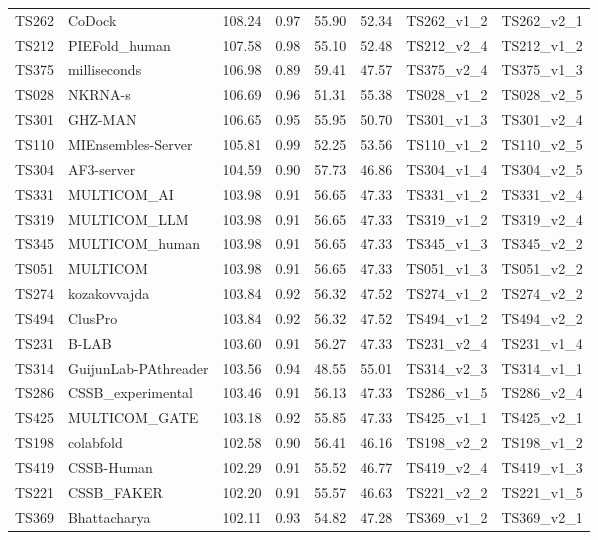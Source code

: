\begin{longtable}{llllllll}
TS262 & CoDock & 108.24 & 0.97 & 55.90 & 52.34 & TS262\_v1\_2 & TS262\_v2\_1 \\ 
TS212 & PIEFold\_human & 107.58 & 0.98 & 55.10 & 52.48 & TS212\_v2\_4 & TS212\_v1\_2 \\ 
TS375 & milliseconds & 106.98 & 0.89 & 59.41 & 47.57 & TS375\_v2\_4 & TS375\_v1\_3 \\ 
TS028 & NKRNA-s & 106.69 & 0.96 & 51.31 & 55.38 & TS028\_v1\_2 & TS028\_v2\_5 \\ 
TS301 & GHZ-MAN & 106.65 & 0.95 & 55.95 & 50.70 & TS301\_v1\_3 & TS301\_v2\_4 \\ 
TS110 & MIEnsembles-Server & 105.81 & 0.99 & 52.25 & 53.56 & TS110\_v1\_2 & TS110\_v2\_5 \\ 
TS304 & AF3-server & 104.59 & 0.90 & 57.73 & 46.86 & TS304\_v1\_4 & TS304\_v2\_5 \\ 
TS331 & MULTICOM\_AI & 103.98 & 0.91 & 56.65 & 47.33 & TS331\_v1\_2 & TS331\_v2\_4 \\ 
TS319 & MULTICOM\_LLM & 103.98 & 0.91 & 56.65 & 47.33 & TS319\_v1\_2 & TS319\_v2\_4 \\ 
TS345 & MULTICOM\_human & 103.98 & 0.91 & 56.65 & 47.33 & TS345\_v1\_3 & TS345\_v2\_2 \\ 
TS051 & MULTICOM & 103.98 & 0.91 & 56.65 & 47.33 & TS051\_v1\_3 & TS051\_v2\_2 \\ 
TS274 & kozakovvajda & 103.84 & 0.92 & 56.32 & 47.52 & TS274\_v1\_2 & TS274\_v2\_2 \\ 
TS494 & ClusPro & 103.84 & 0.92 & 56.32 & 47.52 & TS494\_v1\_2 & TS494\_v2\_2 \\ 
TS231 & B-LAB & 103.60 & 0.91 & 56.27 & 47.33 & TS231\_v2\_4 & TS231\_v1\_4 \\ 
TS314 & GuijunLab-PAthreader & 103.56 & 0.94 & 48.55 & 55.01 & TS314\_v2\_3 & TS314\_v1\_1 \\ 
TS286 & CSSB\_experimental & 103.46 & 0.91 & 56.13 & 47.33 & TS286\_v1\_5 & TS286\_v2\_4 \\ 
TS425 & MULTICOM\_GATE & 103.18 & 0.92 & 55.85 & 47.33 & TS425\_v1\_1 & TS425\_v2\_1 \\ 
TS198 & colabfold & 102.58 & 0.90 & 56.41 & 46.16 & TS198\_v2\_2 & TS198\_v1\_2 \\ 
TS419 & CSSB-Human & 102.29 & 0.91 & 55.52 & 46.77 & TS419\_v2\_4 & TS419\_v1\_3 \\ 
TS221 & CSSB\_FAKER & 102.20 & 0.91 & 55.57 & 46.63 & TS221\_v2\_2 & TS221\_v1\_5 \\ 
TS369 & Bhattacharya & 102.11 & 0.93 & 54.82 & 47.28 & TS369\_v1\_2 & TS369\_v2\_1 \\ 

\end{longtable}
